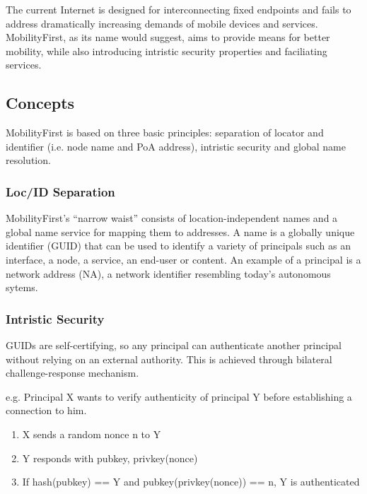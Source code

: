             The current Internet is designed for interconnecting fixed endpoints and fails to address dramatically increasing demands of mobile devices and services. MobilityFirst, as its name would suggest, aims to provide means for better mobility, while also introducing intristic security properties and faciliating services.

        \subsection{Concepts}

            MobilityFirst is based on three basic principles: separation of locator and identifier (i.e. node name and PoA address), intristic security and global name resolution.

            \subsubsection{Loc/ID Separation}

                MobilityFirst's ``narrow waist'' consists of location-independent names and a global name service for mapping them to addresses. A name is a globally unique identifier (GUID) that can be used to identify a variety of principals such as an interface, a node, a service, an end-user or content. An example of a principal is a network address (NA), a network identifier resembling today's autonomous sytems.

            \subsubsection{Intristic Security}

                GUIDs are self-certifying, so any principal can authenticate another principal without relying on an external authority. This is achieved through bilateral challenge-response mechanism.

                e.g. Principal X wants to verify authenticity of principal Y before establishing a connection to him.
                \begin{enumerate}
                    \item X sends a random nonce n to Y
                    \item Y responds with {pubkey, privkey(nonce)}
                    \item If hash(pubkey) == Y and pubkey(privkey(nonce)) == n, Y is authenticated
                \end{enumerate}

